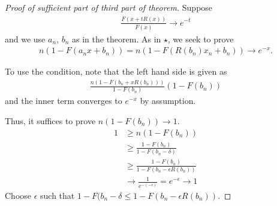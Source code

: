 \begin{proof}[Proof of sufficient part of third part of theorem]
  Suppose
  \begin{align}
    \label{eq:130}
    \frac{\overline F(x + t R(x))}{\overline F(x)} \rightarrow e^{-t}
  \end{align} and we use $a_{n}$, $b_{n}$ as in the theorem.  As in
  $\star$, we seek to prove
  \begin{align}
    \label{eq:131}
    n(1 - F(a_{n} x + b_{n})) = n(1 - F(R(b_{n}) x_{n} + b_{n})) \rightarrow e^{-x}.
  \end{align}

  To use the condition, note that the left hand side is given as
  \begin{align}
    \label{eq:132}
    \frac{n(1 - F(b_{n} + x R(b_{n})))}{1 - F(b_{n})} (1 - F(b_{n}))
  \end{align} and the inner term converges to $e^{-x}$ by assumption.

  Thus, it suffices to prove $n(1 - F(b_{n})) \rightarrow 1$.
  \begin{align}
    \label{eq:133}
    1 &\geq n(1 - F(b_{n})) \\
    &\geq \frac{1 - F(b_{n})}{1 - F(b_{n} - \delta)} \\
  &\geq \frac{1 - F(b_{n})}{1 - F(b_{n} - \epsilon R(b_{n}))} \\
  &\rightarrow \frac{1}{e^{-(-\epsilon)}}  = e^{-\epsilon} \rightarrow 1
  \end{align} Choose $\epsilon$ such that $1 - F(b_{n} - \delta \leq 1
  - F(b_{n} - \epsilon R(b_{n}))$.
\end{proof}

